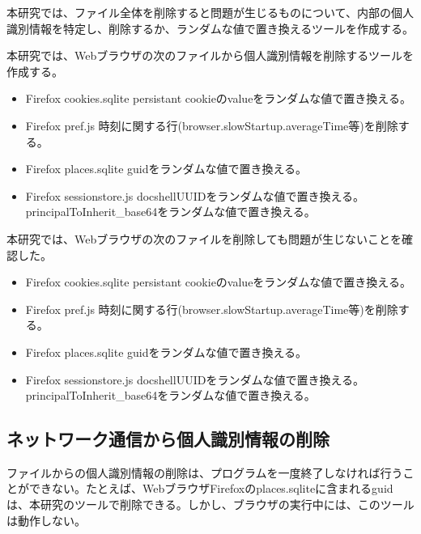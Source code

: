 \documentclass[submit,techrep]{ipsj}
\begin{document}
本研究では、ファイル全体を削除すると問題が生じるものについて、内部の個人識別情報を特定し、削除するか、ランダムな値で置き換えるツールを作成する。

本研究では、Webブラウザの次のファイルから個人識別情報を削除するツールを作成する。

\begin{itemize}
\item
Firefox cookies.sqlite
persistant cookieのvalueをランダムな値で置き換える。
\item
Firefox pref.js
時刻に関する行(browser.slowStartup.averageTime等)を削除する。

\item
Firefox places.sqlite
guidをランダムな値で置き換える。
\item
Firefox sessionstore.js
docshellUUIDをランダムな値で置き換える。
principalToInherit\_base64をランダムな値で置き換える。
\end{itemize}

本研究では、Webブラウザの次のファイルを削除しても問題が生じないことを確認した。

\begin{itemize}
\item
Firefox cookies.sqlite
persistant cookieのvalueをランダムな値で置き換える。
\item
Firefox pref.js
時刻に関する行(browser.slowStartup.averageTime等)を削除する。

\item
Firefox places.sqlite
guidをランダムな値で置き換える。
\item
Firefox sessionstore.js
docshellUUIDをランダムな値で置き換える。
principalToInherit\_base64をランダムな値で置き換える。
\end{itemize}



\subsection{ネットワーク通信から個人識別情報の削除}

ファイルからの個人識別情報の削除は、プログラムを一度終了しなければ行うことができない。たとえば、WebブラウザFirefoxのplaces.sqliteに含まれるguidは、本研究のツールで削除できる。しかし、ブラウザの実行中には、このツールは動作しない。
\end{document}
